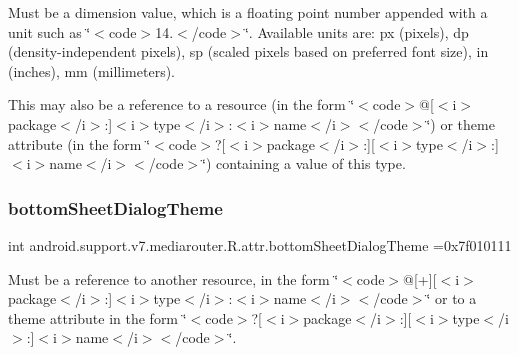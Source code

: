 Must be a dimension value, which is a floating point number appended with a unit such as \char`\"{}$<$code$>$14.\+5sp$<$/code$>$\char`\"{}. Available units are\+: px (pixels), dp (density-\/independent pixels), sp (scaled pixels based on preferred font size), in (inches), mm (millimeters). 

This may also be a reference to a resource (in the form \char`\"{}$<$code$>$@\mbox{[}$<$i$>$package$<$/i$>$\+:\mbox{]}$<$i$>$type$<$/i$>$\+:$<$i$>$name$<$/i$>$$<$/code$>$\char`\"{}) or theme attribute (in the form \char`\"{}$<$code$>$?\mbox{[}$<$i$>$package$<$/i$>$\+:\mbox{]}\mbox{[}$<$i$>$type$<$/i$>$\+:\mbox{]}$<$i$>$name$<$/i$>$$<$/code$>$\char`\"{}) containing a value of this type. \mbox{\label{classandroid_1_1support_1_1v7_1_1mediarouter_1_1R_1_1attr_a3a70ecd8e55ca333f24980174223ca54}} 
\subsubsection{\texorpdfstring{bottom\+Sheet\+Dialog\+Theme}{bottomSheetDialogTheme}}
{\footnotesize\ttfamily int android.\+support.\+v7.\+mediarouter.\+R.\+attr.\+bottom\+Sheet\+Dialog\+Theme =0x7f010111\hspace{0.3cm}{\ttfamily [static]}}

Must be a reference to another resource, in the form \char`\"{}$<$code$>$@\mbox{[}+\mbox{]}\mbox{[}$<$i$>$package$<$/i$>$\+:\mbox{]}$<$i$>$type$<$/i$>$\+:$<$i$>$name$<$/i$>$$<$/code$>$\char`\"{} or to a theme attribute in the form \char`\"{}$<$code$>$?\mbox{[}$<$i$>$package$<$/i$>$\+:\mbox{]}\mbox{[}$<$i$>$type$<$/i$>$\+:\mbox{]}$<$i$>$name$<$/i$>$$<$/code$>$\char`\"{}. \mbox{\label{classandroid_1_1support_1_1v7_1_1mediarouter_1_1R_1_1attr_ad8a192d0439755700da68cf9001f0ff7}} 
